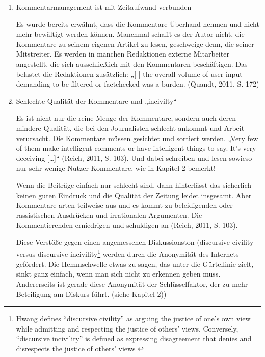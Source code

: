 \begin{enumerate}
\item Kommentarmanagement ist mit Zeitaufwand verbunden

Es wurde bereits erwähnt, dass die Kommentare
Überhand nehmen und nicht mehr bewältigt werden können. Manchmal schafft es der
Autor nicht, die Kommentare zu seinem eigenen Artikel zu lesen, geschweige denn,
die seiner Mitstreiter. Es werden in manchen Redaktionen externe Mitarbeiter
angestellt, die sich ausschließlich mit den Kommentaren beschäftigen. Das
belastet die Redaktionen zusätzlich: „[ ] the overall volume of user input
demanding to be filtered or factchecked was a burden. (Quandt, 2011, S. 172)


\item Schlechte Qualität der Kommentare und „incivilty“

Es ist nicht nur die reine Menge der Kommentare, sondern auch deren mindere
Qualität, die bei den Journalisten schlecht ankommt und Arbeit verursacht. Die
Kommentare müssen gesichtet und sortiert werden. „Very few of them make
intelligent comments or have intelligent things to say. It's very deceiving
[\ldots]“ (Reich, 2011, S. 103).  Und dabei schreiben und lesen sowieso nur sehr
wenige Nutzer Kommentare, wie in Kapitel 2 bemerkt!




Wenn die Beiträge einfach nur schlecht sind, dann hinterlässt das sicherlich
keinen guten Eindruck und die Qualität der Zeitung leidet insgesamt. Aber
Kommentare arten teilweise aus und es kommt zu beleidigenden oder rassistischen
Ausdrücken und irrationalen Argumenten. Die Kommentierenden erniedrigen und
schuldigen an (Reich, 2011, S. 103).

Diese Verstöße gegen einen angemessenen Diskussionston
(\glqq discursive civility\grqq{} versus \glqq discursive incivility\grqq\footnote{Hwang defines
``discursive civility'' as arguing the justice of one's own view while admitting
and respecting the justice of others' views. Conversely, ``discursive
incivility''
is defined as expressing disagreement that denies and disrespects the justice of
others'  views \citep{hwang:2008} \citep[S.~6/7]{santana:2014}} %
werden durch die Anonymität des Internets gefördert. Die Hemmschwelle etwas zu
sagen, das unter die Gürtellinie zielt, sinkt ganz einfach, wenn man sich nicht
zu erkennen geben muss. Andererseits ist gerade diese Anonymität der
Schlüsselfaktor, der zu mehr Beteiligung am Diskurs führt. (siehe Kapitel 2))


\end{enumerate}
